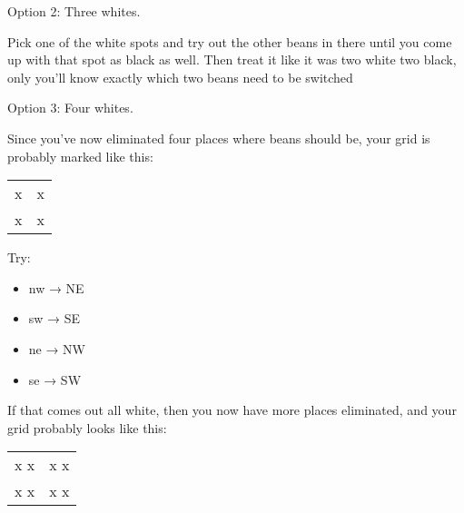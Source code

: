 \documentclass[12pt]{article}
\providecommand{\tightlist}{%
  \setlength{\itemsep}{0pt}\setlength{\parskip}{0pt}}
\begin{document}
Option 2: Three whites.

Pick one of the white spots and try out the other beans in there until
you come up with that spot as black as well. Then treat it like it was
two white two black, only you'll know exactly which two beans need to be
switched

Option 3: Four whites.

Since you've now eliminated four places where beans should be, your grid
is probably marked like this:

\begin{longtable}[]{@{}ll@{}}
\toprule
\begin{minipage}[t]{0.05\columnwidth}\raggedright\strut
x
\strut\end{minipage} &
\begin{minipage}[t]{0.05\columnwidth}\raggedright\strut
x
\strut\end{minipage}\tabularnewline
\begin{minipage}[t]{0.05\columnwidth}\raggedright\strut
x
\strut\end{minipage} &
\begin{minipage}[t]{0.05\columnwidth}\raggedright\strut
x
\strut\end{minipage}\tabularnewline
\bottomrule
\end{longtable}

Try:

\begin{itemize}
\tightlist
\item
  nw → NE
\item
  sw → SE
\item
  ne → NW
\item
  se → SW
\end{itemize}

If that comes out all white, then you now have more places eliminated,
and your grid probably looks like this:

\begin{longtable}[]{@{}ll@{}}
\toprule
\begin{minipage}[t]{0.05\columnwidth}\raggedright\strut
x x
\strut\end{minipage} &
\begin{minipage}[t]{0.05\columnwidth}\raggedright\strut
x x
\strut\end{minipage}\tabularnewline
\begin{minipage}[t]{0.05\columnwidth}\raggedright\strut
x x
\strut\end{minipage} &
\begin{minipage}[t]{0.05\columnwidth}\raggedright\strut
x x
\strut\end{minipage}\tabularnewline
\bottomrule
\end{longtable}
\end{document}

